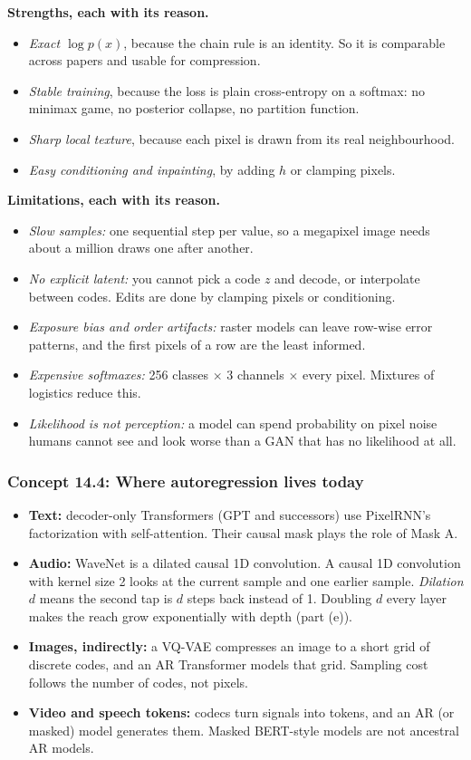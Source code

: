 \documentclass[12pt,a4paper]{article}
\begin{document}
\textbf{Strengths, each with its reason.}
\begin{itemize}[nosep]
  \item \emph{Exact $\log p(x)$}, because the chain rule is an identity. So it is comparable across papers and usable for compression.
  \item \emph{Stable training}, because the loss is plain cross-entropy on a softmax: no minimax game, no posterior collapse, no partition function.
  \item \emph{Sharp local texture}, because each pixel is drawn from its real neighbourhood.
  \item \emph{Easy conditioning and inpainting}, by adding $h$ or clamping pixels.
\end{itemize}
\textbf{Limitations, each with its reason.}
\begin{itemize}[nosep]
  \item \emph{Slow samples:} one sequential step per value, so a megapixel image needs about a million draws one after another.
  \item \emph{No explicit latent:} you cannot pick a code $z$ and decode, or interpolate between codes. Edits are done by clamping pixels or conditioning.
  \item \emph{Exposure bias and order artifacts:} raster models can leave row-wise error patterns, and the first pixels of a row are the least informed.
  \item \emph{Expensive softmaxes:} 256 classes $\times$ 3 channels $\times$ every pixel. Mixtures of logistics reduce this.
  \item \emph{Likelihood is not perception:} a model can spend probability on pixel noise humans cannot see and look worse than a GAN that has no likelihood at all.
\end{itemize}

\subsubsection{Concept 14.4: Where autoregression lives today}\label{c14-4}

\begin{itemize}[nosep]
  \item \textbf{Text:} decoder-only Transformers (GPT and successors) use PixelRNN's factorization with self-attention. Their causal mask plays the role of Mask A.
  \item \textbf{Audio:} WaveNet is a dilated causal 1D convolution. A causal 1D convolution with kernel size 2 looks at the current sample and one earlier sample. \emph{Dilation} $d$ means the second tap is $d$ steps back instead of 1. Doubling $d$ every layer makes the reach grow exponentially with depth (part (e)).
  \item \textbf{Images, indirectly:} a VQ-VAE compresses an image to a short grid of discrete codes, and an AR Transformer models that grid. Sampling cost follows the number of codes, not pixels.
  \item \textbf{Video and speech tokens:} codecs turn signals into tokens, and an AR (or masked) model generates them. Masked BERT-style models are not ancestral AR models.
\end{itemize}
\end{document}
